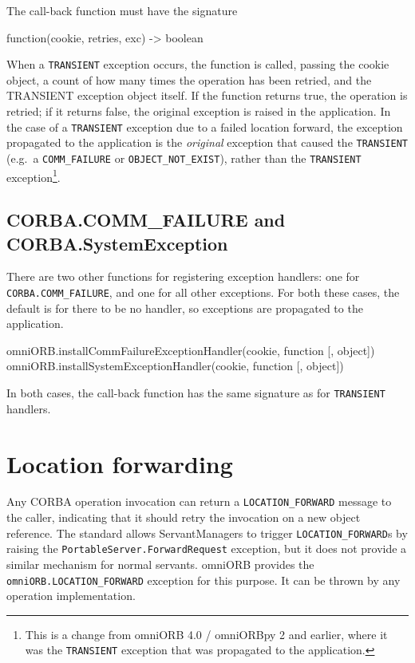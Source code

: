 \documentclass[draft,11pt,twoside,a4paper]{book}
\newcommand{\code}[1]{\texttt{#1}}
\newcommand{\dsc}{\discretionary{}{}{}}
\begin{document}
The call-back function must have the signature

\begin{pylisting}
function(cookie, retries, exc) -> boolean
\end{pylisting}

When a \code{TRANSIENT} exception occurs, the function is called,
passing the cookie object, a count of how many times the operation has
been retried, and the TRANSIENT exception object itself. If the
function returns true, the operation is retried; if it returns false,
the original exception is raised in the application. In the case of a
\code{TRANSIENT} exception due to a failed location forward, the
exception propagated to the application is the \emph{original}
exception that caused the \code{TRANSIENT} (e.g.\ a
\code{COMM\_FAILURE} or \code{OBJECT\_NOT\_EXIST}), rather than the
\code{TRANSIENT} exception\footnote{This is a change from omniORB 4.0
/ omniORBpy 2 and earlier, where it was the \code{TRANSIENT} exception
that was propagated to the application.}.



\subsection{CORBA.COMM\_FAILURE and CORBA.SystemException}

There are two other functions for registering exception handlers: one
for \code{CORBA.\dsc{}COMM\_FAILURE}, and one for all other
exceptions. For both these cases, the default is for there to be no
handler, so exceptions are propagated to the application.

\begin{pylisting}
omniORB.installCommFailureExceptionHandler(cookie, function [, object])
omniORB.installSystemExceptionHandler(cookie, function [, object])
\end{pylisting}

\noindent In both cases, the call-back function has the same signature
as for \code{TRANSIENT} handlers.



\section{Location forwarding}
\label{sec:locationForward}

Any CORBA operation invocation can return a \code{LOCATION\_FORWARD}
message to the caller, indicating that it should retry the invocation
on a new object reference. The standard allows ServantManagers to
trigger \code{LOCATION\_FORWARD}s by raising the
\code{PortableServer.ForwardRequest} exception, but it does not
provide a similar mechanism for normal servants. omniORB provides the
\code{omniORB.\dsc{}LOCATION\_FORWARD} exception for this purpose. It
can be thrown by any operation implementation.
\end{document}

